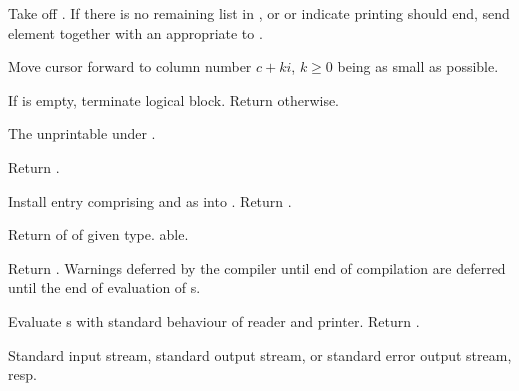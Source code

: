 \begin{LIST}{1cm}
\begin{LIST}{.5cm}
    Take  off . If there is no remaining
    list in , or  or  indicate
    printing should end, send element together with an appropriate to
    . 

    Move cursor forward to column number $c + ki$, $k \geq 0$ being as small
    as possible.

    If  is empty, terminate logical block. Return
    \retval{\NIL} otherwise.

  \end{LIST}


  The  unprintable under .

  Return .

  Install entry comprising  and  as
   into . Return \retval{\NIL}.

  Return  of  of given type. able.


  Return . Warnings deferred by the compiler until end
  of compilation are deferred until the end of evaluation of s.
  

  Evaluate s with standard behaviour of reader and
  printer. Return .

  Standard input stream, standard output stream, 
  or standard error output stream, resp.



\end{LIST}
